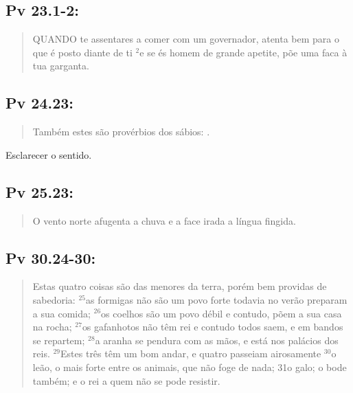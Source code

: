 \subsection*{Pv 23.1-2:} 
 \begin{quote} 
 \small
 QUANDO te assentares a comer com um governador, atenta bem para o que é posto diante de ti\uwave{,} $^{\mathrm{2}}$e se és homem de grande apetite, põe uma faca à tua garganta.
\end{quote}

\subsection*{Pv 24.23:} 
 \begin{quote} 
 Também estes são provérbios dos sábios: .
 \end{quote}
 
Esclarecer o sentido.

\subsection*{Pv 25.23:} 
 \begin{quote} 
 O vento norte afugenta a chuva\uwave{,} e a face irada\uwave{,} a língua fingida.
\end{quote}

\subsection*{Pv 30.24-30:} 
 \begin{quote} 
 Estas quatro coisas são das menores da terra, porém bem providas de sabedoria: $^{\mathrm{25}}$as formigas não são um povo forte\uwave{;} todavia no verão preparam a sua comida; $^{\mathrm{26}}$os coelhos são um povo débil\uwave{;} e contudo, põem a sua casa na rocha; $^{\mathrm{27}}$os gafanhotos não têm rei\uwave{;} e contudo todos saem, e em bandos se repartem; $^{\mathrm{28}}$a aranha se pendura com as mãos, e está nos palácios dos reis. $^{\mathrm{29}}$Estes três têm um bom andar, e quatro passeiam airosamente\uwave{;} $^{\mathrm{30}}$o leão, o mais forte entre os animais, que não foge de nada; 31o galo; o bode também; e o rei a quem não se pode resistir.
\end{quote}

